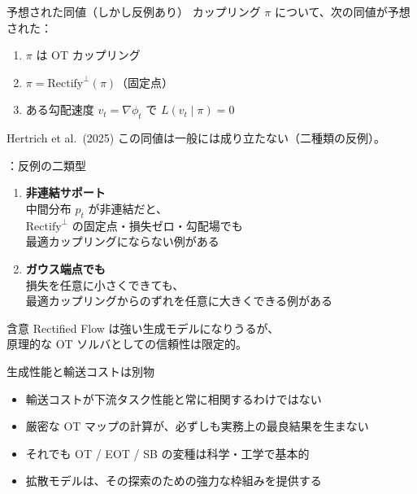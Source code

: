 \asmain
\begin{frame}{予想された同値（しかし反例あり）}
    カップリング $\pi$ について、次の同値が予想された：
    \begin{enumerate}
        \item[(i)] $\pi$ は OT カップリング
        \item[(ii)] $\pi=\mathrm{Rectify}^\perp(\pi)$（固定点）
        \item[(iii)] ある勾配速度 $v_t=\nabla\phi_t$ で $L(v_t\mid\pi)=0$
    \end{enumerate}
    \begin{alertblock}{Hertrich et al.\ (2025)}
        この同値は一般には成り立たない（二種類の反例）。
    \end{alertblock}
\end{frame}
\assuppl
\begin{frame}{\supplmark：反例の二類型}
    \begin{enumerate}
        \item \textbf{非連結サポート}\\
        中間分布 $p_t$ が非連結だと、\\
        $\mathrm{Rectify}^\perp$ の固定点・損失ゼロ・勾配場でも\\
        最適カップリングにならない例がある
        \item \textbf{ガウス端点でも}\\
        損失を任意に小さくできても、\\
        最適カップリングからのずれを任意に大きくできる例がある
    \end{enumerate}
    \begin{exampleblock}{含意}
        Rectified Flow は強い生成モデルになりうるが、\\
        原理的な OT ソルバとしての信頼性は限定的。
    \end{exampleblock}
\end{frame}
\asmain
\begin{frame}{生成性能と輸送コストは別物}
    \begin{itemize}
        \item 輸送コストが下流タスク性能と常に相関するわけではない
        \item 厳密な OT マップの計算が、必ずしも実務上の最良結果を生まない
        \item それでも OT / EOT / SB の変種は科学・工学で基本的
        \item 拡散モデルは、その探索のための強力な枠組みを提供する
    \end{itemize}
\end{frame}
